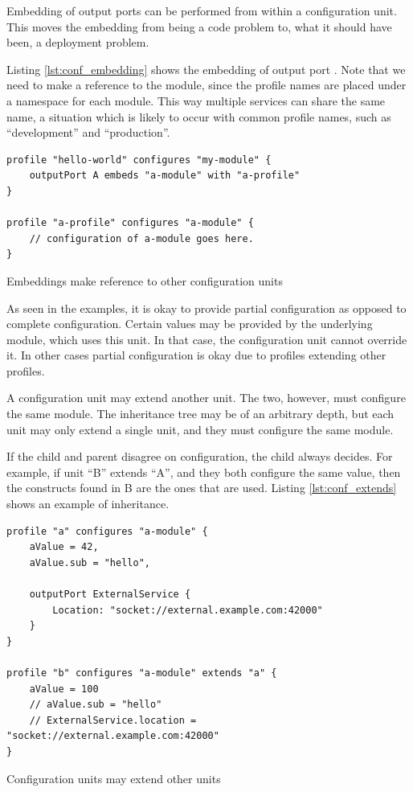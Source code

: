 Embedding of output ports can be performed from within a configuration unit.
This moves the embedding from being a code problem to, what it should have
been, a deployment problem.

Listing \ref{lst:conf_embedding} shows the embedding of output port .
Note that we need to make a reference to the module, since the profile names
are placed under a namespace for each module. This way multiple services can
share the same name, a situation which is likely to occur with common profile
names, such as ``development'' and ``production''.

\begin{listing}[H]
\begin{verbatim}
profile "hello-world" configures "my-module" {
    outputPort A embeds "a-module" with "a-profile"
}

profile "a-profile" configures "a-module" {
    // configuration of a-module goes here.
}
\end{verbatim}
\caption{Embeddings make reference to other configuration units}
\label{lst:conf_embedding}
\end{listing}

As seen in the examples, it is okay to provide partial configuration as opposed
to complete configuration. Certain values may be provided by the underlying
module, which uses this unit. In that case, the configuration unit cannot
override it.  In other cases partial configuration is okay due to profiles
extending other profiles.

A configuration unit may extend another unit. The two, however, must configure
the same module. The inheritance tree may be of an arbitrary depth, but
each unit may only extend a single unit, and they must configure the same
module.

If the child and parent disagree on configuration, the child always decides.
For example, if unit ``B'' extends ``A'', and they both configure the same
value, then the constructs found in B are the ones that are used. Listing
\ref{lst:conf_extends} shows an example of inheritance.

\begin{listing}[H]
\begin{verbatim}
profile "a" configures "a-module" {
    aValue = 42,
    aValue.sub = "hello",

    outputPort ExternalService {
        Location: "socket://external.example.com:42000"
    }
}

profile "b" configures "a-module" extends "a" {
    aValue = 100
    // aValue.sub = "hello"
    // ExternalService.location = "socket://external.example.com:42000"
}
\end{verbatim}
\caption{Configuration units may extend other units}
\label{lst:conf_extends}
\end{listing}

